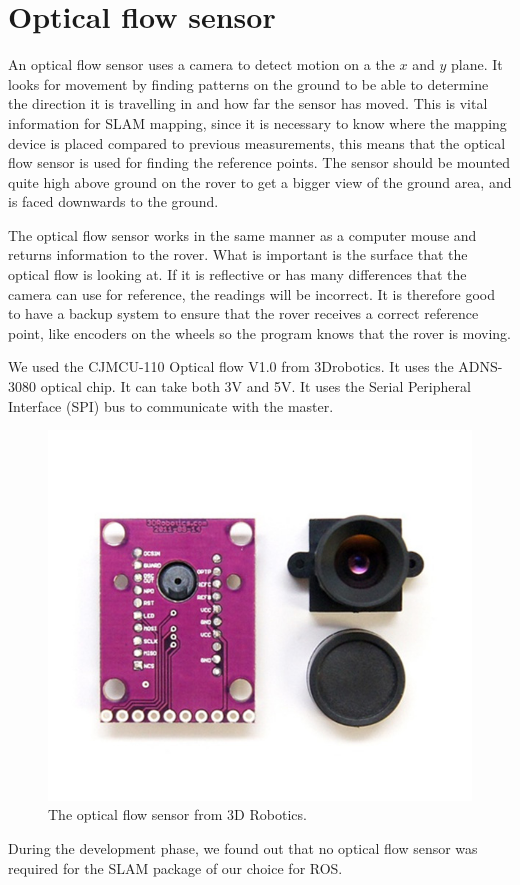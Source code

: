 \clearpage
\section{Optical flow sensor}

An optical flow sensor uses a camera to detect motion on a the $x$ and $y$ plane. It looks for movement by finding patterns on the ground to be able to determine the direction it is travelling in and how far the sensor has moved. This is vital information for SLAM mapping, since it is necessary to know where the mapping device is placed compared to previous measurements, this means that the optical flow sensor is used for finding the reference points. The sensor should be mounted quite high above ground on the rover to get a bigger view of the ground area, and is faced downwards to the ground\cite{opti_using}.

The optical flow sensor works in the same manner as a computer mouse and returns information to the rover. What is important is the surface that the optical flow is looking at. If it is reflective or has many differences that the camera can use for reference, the readings will be incorrect. It is therefore good to have a backup system to ensure that the rover receives a correct reference point, like encoders on the wheels so the program knows that the rover is moving.

We used the CJMCU-110 Optical flow V1.0 from 3Drobotics. It uses the ADNS-3080 optical chip. It can take both 3V and 5V. It uses the Serial Peripheral Interface (SPI) bus to communicate with the master\cite{opti_datasheet}.

\begin{figure}[H]
	\centering
	\includegraphics[width=.3\linewidth]{images/optical.jpg}
	\caption{The optical flow sensor from 3D Robotics.\cite{optfig}}
\end{figure}

During the development phase, we found out that no optical flow sensor was required for the SLAM package of our choice for ROS.